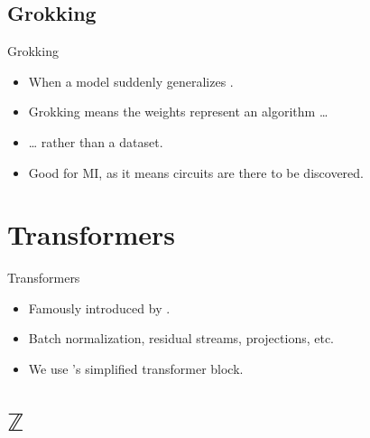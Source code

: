 \documentclass[aspectratio=32]{beamer}
\providecommand{\tightlist}{\setlength{\itemsep}{0pt}\setlength{\parskip}{0pt}}
\begin{document}
  \subsection{\textbar{} Grokking}\label{grokking}

  \begin{frame}[allowframebreaks]{\textbar{} Grokking}
  \begin{itemize}
  \tightlist
  \item
    When a model suddenly generalizes \autocite{power2022}.
  \item
    Grokking means the weights represent an algorithm \ldots{}
  \item
    \ldots{} rather than a dataset.
  \item
    Good for MI, as it means circuits are there to be discovered.
  \end{itemize}
  \end{frame}

  \section{\textbar{} Transformers}\label{transformers}

  \begin{frame}[allowframebreaks]{\textbar{} Transformers}
  \begin{itemize}
  \tightlist
  \item
    Famously introduced by \textcite{vaswani2017}.
  \item
    Batch normalization, residual streams, projections, etc.
  \item
    We use \textcite{he2023}'s simplified transformer block.
  \end{itemize}
  \end{frame}


  \section{\texorpdfstring{\textbar{} \(\mathbb{Z}\)}{\textbar{} \textbackslash mathbb\{Z\}}}\label{mathbbz}
\end{document}
